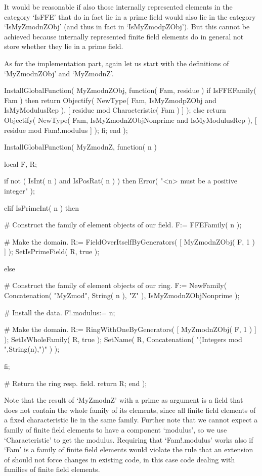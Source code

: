 It would be reasonable if also those internally represented elements
in the category `IsFFE' that do in fact lie in a prime field
would also  lie in the category `IsMyZmodnZObj' (and thus in fact in
`IsMyZmodpZObj').
But this cannot be achieved because internally represented finite field
elements do in general not store whether they lie in a prime field.

As for the implementation part,
again let us start with the definitions of `MyZmodnZObj' and `MyZmodnZ'.

\begintt
InstallGlobalFunction( MyZmodnZObj, function( Fam, residue )
if IsFFEFamily( Fam ) then
  return Objectify( NewType( Fam,     IsMyZmodpZObj
                                  and IsMyModulusRep ),
                    [ residue mod Characteristic( Fam ) ] );
else
  return Objectify( NewType( Fam,     IsMyZmodnZObjNonprime
                                  and IsMyModulusRep ),
                    [ residue mod Fam!.modulus ] );
fi;
end );


InstallGlobalFunction( MyZmodnZ, function( n )

    local F, R;

    if not ( IsInt( n ) and IsPosRat( n ) ) then
      Error( "<n> must be a positive integer" );

    elif IsPrimeInt( n ) then

      # Construct the family of element objects of our field.
      F:= FFEFamily( n );

      # Make the domain.
      R:= FieldOverItselfByGenerators( [ MyZmodnZObj( F, 1 ) ] );
      SetIsPrimeField( R, true );

    else

      # Construct the family of element objects of our ring.
      F:= NewFamily( Concatenation( "MyZmod", String( n ), "Z" ),
                     IsMyZmodnZObjNonprime );

      # Install the data.
      F!.modulus:= n;

      # Make the domain.
      R:= RingWithOneByGenerators( [ MyZmodnZObj( F, 1 ) ] );
      SetIsWholeFamily( R, true );
      SetName( R, Concatenation( "(Integers mod ",String(n),")" ) );

    fi;

    # Return the ring resp. field.
    return R;
end );
\endtt

Note that the result of `MyZmodnZ' with a prime as argument is a field that
does not contain the whole family of its elements, since all finite field
elements of a fixed characteristic lie in the same family.
Further note that we cannot expect a family of finite field elements
to have a component `modulus',
so we use `Characteristic' to get the modulus.
Requiring that `Fam!.modulus' works also if `Fam' is a family of
finite field elements would violate the rule
that an extension of {\GAP} should not force changes in existing code,
in this case code dealing with families of finite field elements.

